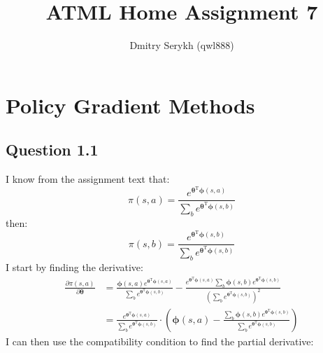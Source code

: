 \documentclass[a4paper]{article}
\title{\vspace{-5cm}ATML Home Assignment 7}
\author{Dmitry Serykh (qwl888)}
\newcommand*{\bs}[1]{\boldsymbol{#1}}
\begin{document}
\maketitle
\section{Policy Gradient Methods}
\label{sec:1}
\subsection*{Question 1.1}
\label{subsec:11}
I know from the assignment text that:
\[
\pi(s, a)=\frac{e^{\boldsymbol{\theta}^{\mathrm{T}} \boldsymbol{\phi}(s, a)}}
   {\sum_{b} e^{\boldsymbol{\theta}^{\mathrm{T}} \boldsymbol{\phi}(s, b)}}
\]
then:
\[
\pi(s, b)=\frac{e^{\boldsymbol{\theta}^{\mathrm{T}} \boldsymbol{\phi}(s, b)}}
   {\sum_{b} e^{\boldsymbol{\theta}^{\mathrm{T}} \boldsymbol{\phi}(s, b)}}
\]
I start by finding the derivative:
\begin{align*}
  \frac{\partial \pi(s, a)}{\partial \bs{\theta}} &=
  \frac{\bs{\phi}(s,a) e^{\boldsymbol{\theta}^{\mathrm{T}} \boldsymbol{\phi}(s, a)}}
       {\sum_{b} e^{\boldsymbol{\theta}^{\mathrm{T}} \boldsymbol{\phi}(s, b)}}
  -
  \frac{e^{\boldsymbol{\theta}^{\mathrm{T}} \boldsymbol{\phi}(s, a)}
        \sum_{b} \boldsymbol{\phi}(s, b)e^{\boldsymbol{\theta}^{\mathrm{T}} \boldsymbol{\phi}(s, b)}}
       {(\sum_{b} e^{\boldsymbol{\theta}^{\mathrm{T}} \boldsymbol{\phi}(s, b)})^2}\\
       &=\frac{e^{\boldsymbol{\theta}^{\mathrm{T}} \boldsymbol{\phi}(s, a)}}
              {\sum_{b} e^{\boldsymbol{\theta}^{\mathrm{T}} \boldsymbol{\phi}(s, b)}}
         \cdot
         \left(
         \boldsymbol{\phi}(s, a)-
         \frac{\sum_{b} \boldsymbol{\phi}(s, b)e^{\boldsymbol{\theta}^{\mathrm{T}} \boldsymbol{\phi}(s, b)}}
              {\sum_{b} e^{\boldsymbol{\theta}^{\mathrm{T}} \boldsymbol{\phi}(s, b)}}
         \right)
\end{align*}
I can then use the compatibility condition to find the partial derivative:
\end{document}
